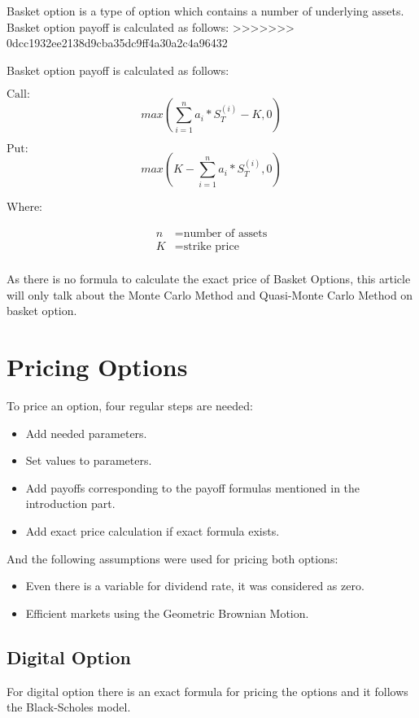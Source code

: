 \documentclass[]{elsarticle}
\theoremstyle{definition}
\theoremstyle{remark}
\begin{document}
Basket option is a type of option  which contains a number of underlying assets. Basket option payoff is calculated as follows:
>>>>>>> 0dcc1932ee2138d9cba35dc9ff4a30a2c4a96432

Basket option payoff is calculated as follows:

$\text{Call}:$
$$max(\sum_{i=1}^n {a_i*S_T^{(i)}} - K, 0)$$

$\text{Put}:$
$$max(K - \sum_{i=1}^n {a_i*S_T^{(i)}}, 0)$$

Where:

\begin{align*}
n & = \text{number of assets}\\ 
K & = \text{strike price}\\
\end{align*}
 
 
As there is no formula to calculate the exact price of Basket Options, this article will only talk about the Monte Carlo Method and Quasi-Monte Carlo Method on basket option.

\section{Pricing Options}

To price an option, four regular steps are needed:
\begin{itemize}
\item Add needed parameters.
\item Set values to parameters.
\item Add payoffs corresponding to the payoff formulas mentioned in the introduction part.
\item Add exact price calculation if exact formula exists.
\end{itemize}

\hfill

And the following assumptions were used for pricing both options:
\begin{itemize}
\item Even there is a variable for dividend rate, it was considered as zero.
\item Efficient markets using the Geometric Brownian Motion.
\end{itemize}

\subsection{Digital Option}

For digital option there is an exact formula for pricing the options and it follows the Black-Scholes model.
\end{document}
